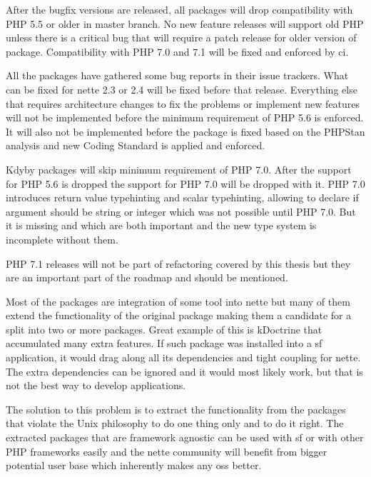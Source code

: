 After the bugfix versions are released, all packages will drop compatibility with PHP 5.5 or older in master branch. No new feature releases will support old PHP unless there is a critical bug that will require a patch release for older version of package. Compatibility with PHP 7.0 and 7.1 will be fixed and enforced by \gls{ci}.

All the packages have gathered some bug reports in their issue trackers. What can be fixed for \gls{nette} 2.3 or 2.4 will be fixed before that release. Everything else that requires architecture changes to fix the problems or implement new features will not be implemented before the minimum requirement of PHP 5.6 is enforced. It will also not be implemented before the package is fixed based on the PHPStan analysis and new Coding Standard is applied and enforced.


Kdyby packages will skip minimum requirement of PHP 7.0. After the support for PHP 5.6 is dropped the support for PHP 7.0 will be dropped with it. PHP 7.0 introduces return value typehinting and scalar typehinting, allowing to declare if argument should be string or integer which was not possible until PHP 7.0. But it is missing  and  which are both important and the new type system is incomplete without them.

PHP 7.1 releases will not be part of refactoring covered by this thesis but they are an important part of the roadmap and should be mentioned.


Most of the packages are integration of some tool into \gls{nette} but many of them extend the functionality of the original package making them a candidate for a split into two or more packages. Great example of this is \gls{kDoctrine} that accumulated many extra features. If such package was installed into a \gls{sf} application, it would drag along all its dependencies and tight coupling for \gls{nette}. The extra dependencies can be ignored and it would most likely work, but that is not the best way to develop applications.

The solution to this problem is to extract the functionality from the packages that violate the Unix philosophy to do one thing only and to do it right. The extracted packages that are framework agnostic can be used with \gls{sf} or with other PHP frameworks easily and the \gls{nette} community will benefit from bigger potential user base which inherently makes any \gls{oss} better.

